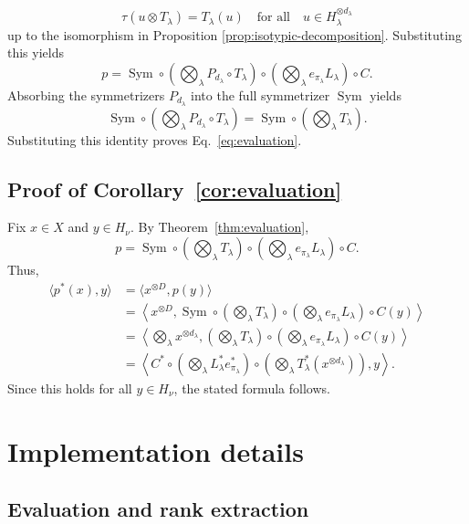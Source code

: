 \documentclass[11pt]{article}
\newcommand{\Sym}{\operatorname{Sym}}
\theoremstyle{definition}
\begin{document}
\[
  \tau(u\otimes T_\lambda)=T_\lambda(u)
  \quad
  \text{for all}
  \quad
  u\in H_\lambda^{\otimes d_\lambda}
\]
up to the isomorphism in Proposition \ref{prop:isotypic-decomposition}.  Substituting this yields
\[
  p
  =
  \Sym
  \circ
  \left(\bigotimes_\lambda P_{d_\lambda}\circ T_\lambda\right)
  \circ
  \left(\bigotimes_\lambda e_{\pi_\lambda}L_\lambda\right)
  \circ
  C.
\]
Absorbing the symmetrizers $P_{d_\lambda}$ into the full symmetrizer $\Sym$ yields
\[
  \Sym
  \circ
  \left(\bigotimes_\lambda P_{d_\lambda}\circ T_\lambda\right)
  =
  \Sym
  \circ
  \left(\bigotimes_\lambda T_\lambda\right).
\]
Substituting this identity proves Eq.~\eqref{eq:evaluation}.

\subsection{Proof of Corollary~\ref{cor:evaluation}}\label{sec:proof-corollary-evaluation}

Fix $x\in X$ and $y\in H_\nu$.
By Theorem~\ref{thm:evaluation},
\[
  p
  =
  \Sym
  \circ
  \left(\bigotimes_\lambda T_\lambda\right)
  \circ
  \left(\bigotimes_\lambda e_{\pi_\lambda}L_\lambda\right)
  \circ
  C.
\]
Thus,
\begin{align*}
  \langle p^*(x),y\rangle
  &=
  \langle x^{\otimes D},p(y)\rangle \\
  &=
  \left\langle
  x^{\otimes D},
  \Sym
  \circ
  \left(\bigotimes_\lambda T_\lambda\right)
  \circ
  \left(\bigotimes_\lambda e_{\pi_\lambda}L_\lambda\right)
  \circ
  C(y)
  \right\rangle \\
  &=
  \left\langle
  \bigotimes_\lambda x^{\otimes d_\lambda},
  \left(\bigotimes_\lambda T_\lambda\right)
  \circ
  \left(\bigotimes_\lambda e_{\pi_\lambda}L_\lambda\right)
  \circ
  C(y)
  \right\rangle \\
  &=
  \left\langle
  C^*
  \circ
  \left(\bigotimes_\lambda L_\lambda^*e_{\pi_\lambda}^*\right)
  \circ
  \left(\bigotimes_\lambda T_\lambda^*(x^{\otimes d_\lambda})\right),
  y
  \right\rangle.
\end{align*}
Since this holds for all $y\in H_\nu$, the stated formula follows.

\section{Implementation details}
\label{sec:appendix-implementation}

\subsection{Evaluation and rank extraction}
\end{document}
